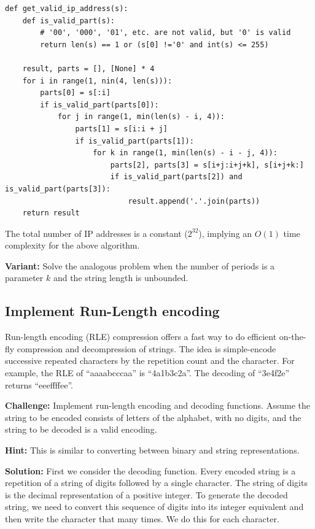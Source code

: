 \documentclass[11pt,a4paper]{article}
\begin{document}
\begin{verbatim}
def get_valid_ip_address(s): 
    def is_valid_part(s):
        # '00', '000', '01', etc. are not valid, but '0' is valid
        return len(s) == 1 or (s[0] !='0' and int(s) <= 255)

    result, parts = [], [None] * 4
    for i in range(1, nin(4, len(s))):
        parts[0] = s[:i]
        if is_valid_part(parts[0]):
            for j in range(1, min(len(s) - i, 4)):
                parts[1] = s[i:i + j]
                if is_valid_part(parts[1]):
                    for k in range(1, min(len(s) - i - j, 4)): 
                        parts[2], parts[3] = s[i+j:i+j+k], s[i+j+k:]
                        if is_valid_part(parts[2]) and is_valid_part(parts[3]):
                            result.append('.'.join(parts))
    return result
\end{verbatim}  

The total number of IP addresses is a constant ($2^{32}$), implying an $O(1)$
time complexity for the above algorithm.

\textbf{Variant:} Solve the analogous problem when the number of periods is a
parameter $k$ and the string length is unbounded.

\subsection{Implement Run-Length encoding}

Run-length encoding (RLE) compression offers a fast way to do efficient
on-the-fly compression and decompression of strings. The idea is simple-encode
successive repeated characters by the repetition count and the character. For
example, the RLE of ``aaaabcccaa'' is ``4a1b3c2a''. The decoding of ``3e4f2e''
returns ``eeeffffee''.

\textbf{Challenge:} Implement run-length encoding and decoding functions.
Assume the string to be encoded consists of letters of the alphabet, with no
digits, and the string to be decoded is a valid encoding.

\textbf{Hint:} This is similar to converting between binary and string 
representations.

\textbf{Solution:} First we consider the decoding function. Every encoded
string is a repetition of a string of digits followed by a single character.
The string of digits is the decimal representation of a positive integer. To
generate the decoded string, we need to convert this sequence of digits into
its integer equivalent and then write the character that many times. We do
this for each character.
\end{document}
